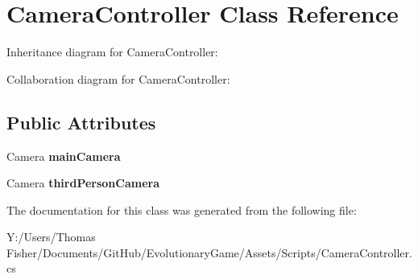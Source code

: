 \hypertarget{class_camera_controller}{}\section{Camera\+Controller Class Reference}
\label{class_camera_controller}


Inheritance diagram for Camera\+Controller\+:


Collaboration diagram for Camera\+Controller\+:
\subsection*{Public Attributes}
\begin{DoxyCompactItemize}
\item 
\mbox{\label{class_camera_controller_a8393464679e71c7fe4f5e972e75f201e}} 
Camera {\bfseries main\+Camera}
\item 
\mbox{\label{class_camera_controller_a6f3d21e4def9e7187bb8adf1f2e2805f}} 
Camera {\bfseries third\+Person\+Camera}
\end{DoxyCompactItemize}


The documentation for this class was generated from the following file\+:\begin{DoxyCompactItemize}
\item 
Y\+:/\+Users/\+Thomas Fisher/\+Documents/\+Git\+Hub/\+Evolutionary\+Game/\+Assets/\+Scripts/Camera\+Controller.\+cs\end{DoxyCompactItemize}
